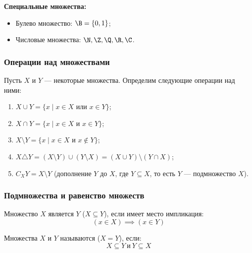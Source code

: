 \noindent \textbf{Специальные множества:}
\begin{itemize}
    \item Булево множество: \(\B = \{0, 1\}\);
    \item Числовые множества: \(\N, \Z, \Q, \R, \C\).
\end{itemize}

\subsubsection{Операции над множествами}

\begin{definition}
    Пусть \(X\) и \(Y\) --- некоторые множества. Определим следующие операции над ними:
    \begin{enumerate}
        \item {} \(X \cup Y = \{x \mid x \in X \text{ или } x \in Y\}\);
        \item {} \(X \cap Y = \{x \mid x \in X \text{ и } x \in Y\}\);
        \item {} \(X \setminus Y = \{x \mid x \in X \text{ и } x \notin Y\}\);
        \item {} \(X \triangle Y = (X \setminus Y) \cup (Y \setminus X) = (X \cup Y) \setminus  (Y \cap X)\);
        \item {} \(C_X Y = X \setminus Y\) (дополнение \(Y\) до \(X\), где \( Y \subseteq X \), то есть \(Y\) --- подмножество \(X\)).
    \end{enumerate}
\end{definition}

\subsubsection{Подмножества и равенство множеств}

\begin{definition}
    Множество \(X\) является  \(Y\) (\(X \subseteq Y\)), если имеет место импликация:
    \[
        (x \in X) \implies (x \in Y)
    \]
\end{definition}

\begin{definition}
    Множества \(X\) и \(Y\) называются  (\(X = Y\)), если:
    \[
        X \subseteq Y \ \text{и} \ Y \subseteq X
    \]
\end{definition}

